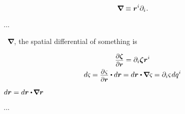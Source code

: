 \vspace{-0.4em}\noindent
{}

\nopagebreak\vspace{-0.4em}
\begin{equation}\label{whatisthenablaoperator}
\bm{\nabla}\hspace{-0.2ex} \equiv \bm{r}^i \partial_i \hspace{.1ex} .
\end{equation}

...

~${\bm{\nabla}\hspace{-0.2ex}}$,
the spatial differential of something is

\nopagebreak\vspace{-0.2em}
\begin{equation}\label{spatialdifferentialofsomething.with-nabla}
\begin{gathered}
\scalebox{.9}{$ \displaystyle \frac{\raisemath{-0.2em}{\partial \bm{\zeta}}}{\partial \currentlocationvector} $} = \partial_i \bm{\zeta} \currentlocationvector^{i}
\\
%
d \varsigma \hspace{-0.1ex}
=
\scalebox{.9}{$ \displaystyle\frac{\raisebox{-0.2em}{$\partial \hspace{.1ex} \varsigma$}}{\raisebox{-0.05em}{$\partial \locationvector$}} $}
\dotp
d\locationvector \hspace{-0.1ex}
=
d\locationvector \dotp \hspace{-0.11ex} \boldnabla \varsigma \hspace{-0.1ex}
=
\partial_i \varsigma \hspace{.15ex} dq^i
\end{gathered}
\end{equation}

\vspace{1.1em}${
d\locationvector = d\locationvector \dotp \hspace{-0.2ex} \tikzmark{beginItsUnitTensorE} \boldnabla \locationvector \tikzmark{endItsUnitTensorE}
}$%

...


